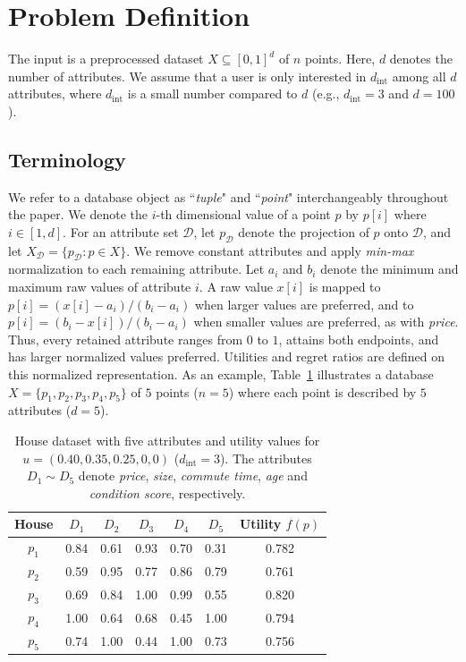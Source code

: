 \section{Problem Definition}
\label{sec:def}

The input is a preprocessed dataset $X\subseteq[0,1]^d$ of $n$ points. Here, $d$ denotes the number of attributes. We assume that a user is only interested in $d_\text{int}$ among all $d$ attributes, where $d_\text{int}$ is a small number compared to $d$ (e.g., $d_\text{int}=3$ and $d=100$).

\subsection{Terminology}

We refer to a database object as ``\textit{tuple}" and ``\textit{point}" interchangeably throughout the paper. We denote the $i$-th dimensional value of a point $p$ by $p[i]$ where $i \in [1,d]$. For an attribute set $\mathcal{D}$, let $p_{\mathcal{D}}$ denote the projection of $p$ onto $\mathcal{D}$, and let $X_{\mathcal{D}}=\{p_{\mathcal{D}}:p\in X\}$. We remove constant attributes and apply \textit{min-max} normalization to each remaining attribute. Let $a_i$ and $b_i$ denote the minimum and maximum raw values of attribute $i$. A raw value $x[i]$ is mapped to $p[i]=(x[i]-a_i)/(b_i-a_i)$ when larger values are preferred, and to $p[i]=(b_i-x[i])/(b_i-a_i)$ when smaller values are preferred, as with \textit{price}. Thus, every retained attribute ranges from $0$ to $1$, attains both endpoints, and has larger normalized values preferred. Utilities and regret ratios are defined on this normalized representation. As an example, Table~\ref{tab:house} illustrates a database $X=\{p_1, p_2, p_3, p_4, p_5\}$ of $5$ points ($n=5$) where each point is described by $5$ attributes ($d=5$).

\begin{table}[!t]
\centering
\begin{tabular}{|c|c|c|c|c|c|c|}
\hline
\textbf{House} & $D_1$ & $D_2$ & $D_3$ & $D_4$ & $D_5$ & \textbf{Utility} $f(p)$ \\
\hline
$p_1$ & 0.84 & 0.61 & 0.93 & 0.70 & 0.31 & 0.782 \\
\hline
$p_2$ & 0.59 & 0.95 & 0.77 & 0.86 & 0.79 & 0.761 \\
\hline
$p_3$ & 0.69 & 0.84 & 1.00 & 0.99 & 0.55 & 0.820 \\
\hline
$p_4$ & 1.00 & 0.64 & 0.68 & 0.45 & 1.00 & 0.794 \\
\hline
$p_5$ & 0.74 & 1.00 & 0.44 & 1.00 & 0.73 & 0.756 \\
\hline
\end{tabular}
\caption{House dataset with five attributes and utility values for
$u=(0.40,0.35,0.25,0,0)$ ($d_\text{int}=3$).
The attributes $D_1\!\sim\!D_5$ denote \textit{price}, \textit{size}, \textit{commute time}, \textit{age} and \textit{condition score}, respectively.}
\label{tab:house}
\end{table}

